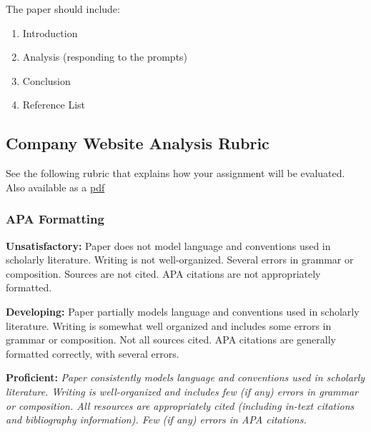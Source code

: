 \documentclass[
]{book}
\providecommand{\tightlist}{%
  \setlength{\itemsep}{0pt}\setlength{\parskip}{0pt}}
\begin{document}
\begin{assessment}
The paper should include:

\begin{enumerate}
\def\labelenumi{\arabic{enumi}.}
\tightlist
\item
  Introduction\\
\item
  Analysis (responding to the prompts)\\
\item
  Conclusion\\
\item
  Reference List
\end{enumerate}
\end{assessment}

\hypertarget{company-website-analysis-rubric}{%
\subsection*{Company Website Analysis Rubric}\label{company-website-analysis-rubric}}

See the following rubric that explains how your assignment will be evaluated. Also available as a \href{assets/assessment/Company-Website-Analysis-RUBRIC.pdf}{pdf}

\hypertarget{apa-formatting}{%
\subsubsection*{APA Formatting}\label{apa-formatting}}

\textbf{Unsatisfactory:} Paper does not model language and conventions used in scholarly literature.
Writing is not well-organized. Several errors in grammar or composition. Sources
are not cited. APA citations are not appropriately formatted.

\textbf{Developing:} Paper partially models language and conventions used in scholarly literature.
Writing is somewhat well organized and includes some errors in grammar or
composition. Not all sources cited. APA citations are generally formatted
correctly, with several errors.

\textbf{Proficient:} \emph{Paper consistently models language and conventions used in scholarly
literature. Writing is well-organized and includes few (if any) errors in
grammar or composition. All resources are appropriately cited (including in-text
citations and bibliography information). Few (if any) errors in APA citations.}
\end{document}
